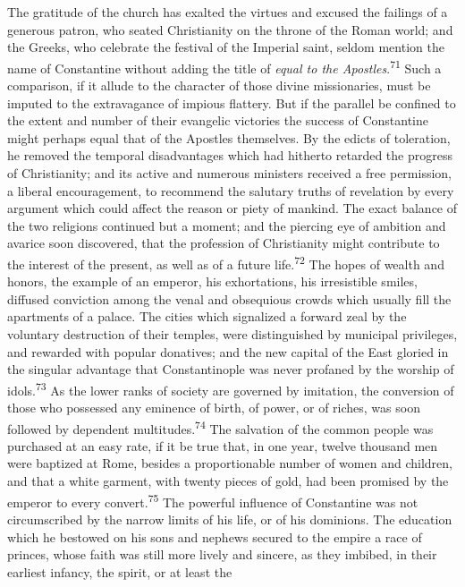 The gratitude of the church has exalted the virtues and excused the
failings of a generous patron, who seated Christianity on the throne of
the Roman world; and the Greeks, who celebrate the festival of the
Imperial saint, seldom mention the name of Constantine without adding
the title of \textit{equal to the Apostles}.\textsuperscript{71} Such a comparison, if it
allude to the character of those divine missionaries, must be imputed
to the extravagance of impious flattery. But if the parallel be
confined to the extent and number of their evangelic victories the
success of Constantine might perhaps equal that of the Apostles
themselves. By the edicts of toleration, he removed the temporal
disadvantages which had hitherto retarded the progress of Christianity;
and its active and numerous ministers received a free permission, a
liberal encouragement, to recommend the salutary truths of revelation
by every argument which could affect the reason or piety of mankind.
The exact balance of the two religions continued but a moment; and the
piercing eye of ambition and avarice soon discovered, that the
profession of Christianity might contribute to the interest of the
present, as well as of a future life.\textsuperscript{72} The hopes of wealth and
honors, the example of an emperor, his exhortations, his irresistible
smiles, diffused conviction among the venal and obsequious crowds which
usually fill the apartments of a palace. The cities which signalized a
forward zeal by the voluntary destruction of their temples, were
distinguished by municipal privileges, and rewarded with popular
donatives; and the new capital of the East gloried in the singular
advantage that Constantinople was never profaned by the worship of
idols.\textsuperscript{73} As the lower ranks of society are governed by imitation, the
conversion of those who possessed any eminence of birth, of power, or
of riches, was soon followed by dependent multitudes.\textsuperscript{74} The salvation
of the common people was purchased at an easy rate, if it be true that,
in one year, twelve thousand men were baptized at Rome, besides a
proportionable number of women and children, and that a white garment,
with twenty pieces of gold, had been promised by the emperor to every
convert.\textsuperscript{75} The powerful influence of Constantine was not circumscribed
by the narrow limits of his life, or of his dominions. The education
which he bestowed on his sons and nephews secured to the empire a race
of princes, whose faith was still more lively and sincere, as they
imbibed, in their earliest infancy, the spirit, or at least the
